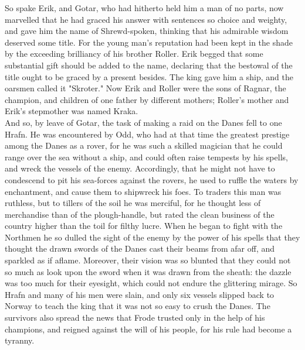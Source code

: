 \documentclass[10pt,a4paper]{report}
\begin{document}
So spake Erik, and Gotar, who had hitherto held him a man of no parts, now marvelled that he had graced his answer with sentences so choice and weighty, and gave him the name of Shrewd-spoken, thinking that his admirable wisdom deserved some title. For the young man's reputation had been kept in the shade by the exceeding brilliancy of his brother Roller. Erik begged that some substantial gift should be added to the name, declaring that the bestowal of the title ought to be graced by a present besides. The king gave him a ship, and the oarsmen called it "Skroter." Now Erik and Roller were the sons of Ragnar, the champion, and children of one father by different mothers; Roller's mother and Erik's stepmother was named Kraka.\\

And so, by leave of Gotar, the task of making a raid on the Danes fell to one Hrafn. He was encountered by Odd, who had at that time the greatest prestige among the Danes as a rover, for he was such a skilled magician that he could range over the sea without a ship, and could often raise tempests by his spells, and wreck the vessels of the enemy. Accordingly, that he might not have to condescend to pit his sea-forces against the rovers, he used to ruffle the waters by enchantment, and cause them to shipwreck his foes. To traders this man was ruthless, but to tillers of the soil he was merciful, for he thought less of merchandise than of the plough-handle, but rated the clean business of the country higher than the toil for filthy lucre. When he began to fight with the Northmen he so dulled the sight of the enemy by the power of his spells that they thought the drawn swords of the Danes cast their beams from afar off, and sparkled as if aflame. Moreover, their vision was so blunted that they could not so much as look upon the sword when it was drawn from the sheath: the dazzle was too much for their eyesight, which could not endure the glittering mirage. So Hrafn and many of his men were slain, and only six vessels slipped back to Norway to teach the king that it was not so easy to crush the Danes. The survivors also spread the news that Frode trusted only in the help of his champions, and reigned against the will of his people, for his rule had become a tyranny.\\
\end{document}
